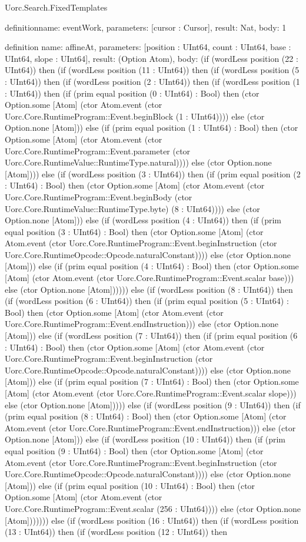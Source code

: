 \begin{lexlean}{Uorc.Search.FixedTemplates}
\begin{semanticmodule}
definition{name: eventWork, parameters: [cursor : Cursor], result: Nat, body: 1}

definition{
  name: affineAt,
  parameters: [position : UInt64, count : UInt64, base : UInt64, slope : UInt64],
  result: (Option Atom),
  body: (if (wordLess position (22 : UInt64)) then (if (wordLess position (11 : UInt64)) then (if (wordLess position (5 : UInt64)) then (if (wordLess position (2 : UInt64)) then (if (wordLess position (1 : UInt64)) then (if (prim equal position (0 : UInt64) : Bool) then (ctor Option.some [Atom] (ctor Atom.event (ctor Uorc.Core.RuntimeProgram::Event.beginBlock (1 : UInt64)))) else (ctor Option.none [Atom])) else (if (prim equal position (1 : UInt64) : Bool) then (ctor Option.some [Atom] (ctor Atom.event (ctor Uorc.Core.RuntimeProgram::Event.parameter (ctor Uorc.Core.RuntimeValue::RuntimeType.natural)))) else (ctor Option.none [Atom]))) else (if (wordLess position (3 : UInt64)) then (if (prim equal position (2 : UInt64) : Bool) then (ctor Option.some [Atom] (ctor Atom.event (ctor Uorc.Core.RuntimeProgram::Event.beginBody (ctor Uorc.Core.RuntimeValue::RuntimeType.byte) (8 : UInt64)))) else (ctor Option.none [Atom])) else (if (wordLess position (4 : UInt64)) then (if (prim equal position (3 : UInt64) : Bool) then (ctor Option.some [Atom] (ctor Atom.event (ctor Uorc.Core.RuntimeProgram::Event.beginInstruction (ctor Uorc.Core.RuntimeOpcode::Opcode.naturalConstant)))) else (ctor Option.none [Atom])) else (if (prim equal position (4 : UInt64) : Bool) then (ctor Option.some [Atom] (ctor Atom.event (ctor Uorc.Core.RuntimeProgram::Event.scalar base))) else (ctor Option.none [Atom]))))) else (if (wordLess position (8 : UInt64)) then (if (wordLess position (6 : UInt64)) then (if (prim equal position (5 : UInt64) : Bool) then (ctor Option.some [Atom] (ctor Atom.event (ctor Uorc.Core.RuntimeProgram::Event.endInstruction))) else (ctor Option.none [Atom])) else (if (wordLess position (7 : UInt64)) then (if (prim equal position (6 : UInt64) : Bool) then (ctor Option.some [Atom] (ctor Atom.event (ctor Uorc.Core.RuntimeProgram::Event.beginInstruction (ctor Uorc.Core.RuntimeOpcode::Opcode.naturalConstant)))) else (ctor Option.none [Atom])) else (if (prim equal position (7 : UInt64) : Bool) then (ctor Option.some [Atom] (ctor Atom.event (ctor Uorc.Core.RuntimeProgram::Event.scalar slope))) else (ctor Option.none [Atom])))) else (if (wordLess position (9 : UInt64)) then (if (prim equal position (8 : UInt64) : Bool) then (ctor Option.some [Atom] (ctor Atom.event (ctor Uorc.Core.RuntimeProgram::Event.endInstruction))) else (ctor Option.none [Atom])) else (if (wordLess position (10 : UInt64)) then (if (prim equal position (9 : UInt64) : Bool) then (ctor Option.some [Atom] (ctor Atom.event (ctor Uorc.Core.RuntimeProgram::Event.beginInstruction (ctor Uorc.Core.RuntimeOpcode::Opcode.naturalConstant)))) else (ctor Option.none [Atom])) else (if (prim equal position (10 : UInt64) : Bool) then (ctor Option.some [Atom] (ctor Atom.event (ctor Uorc.Core.RuntimeProgram::Event.scalar (256 : UInt64)))) else (ctor Option.none [Atom])))))) else (if (wordLess position (16 : UInt64)) then (if (wordLess position (13 : UInt64)) then (if (wordLess position (12 : UInt64)) then }
\end{semanticmodule}
\end{lexlean}
